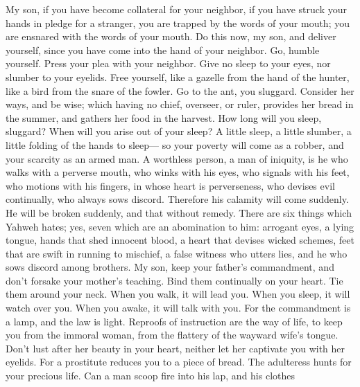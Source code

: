  My son, if you have become collateral for your neighbor,
if you have struck your hands in pledge for a stranger, 
you are trapped by the words of your mouth; you are ensnared with the
words of your mouth.  Do this now, my son, and deliver
yourself, since you have come into the hand of your neighbor. Go, humble
yourself. Press your plea with your neighbor.  Give no
sleep to your eyes, nor slumber to your eyelids.  Free
yourself, like a gazelle from the hand of the hunter, like a bird from
the snare of the fowler.  Go to the ant, you sluggard.
Consider her ways, and be wise;  which having no chief,
overseer, or ruler,  provides her bread in the summer, and
gathers her food in the harvest.  How long will you sleep,
sluggard? When will you arise out of your sleep?  A
little sleep, a little slumber, a little folding of the hands to
sleep---  so your poverty will come as a robber, and your
scarcity as an armed man.  A worthless person, a man of
iniquity, is he who walks with a perverse mouth,  who
winks with his eyes, who signals with his feet, who motions with his
fingers,  in whose heart is perverseness, who devises
evil continually, who always sows discord.  Therefore his
calamity will come suddenly. He will be broken suddenly, and that
without remedy.  There are six things which Yahweh hates;
yes, seven which are an abomination to him:  arrogant
eyes, a lying tongue, hands that shed innocent blood,  a
heart that devises wicked schemes, feet that are swift in running to
mischief,  a false witness who utters lies, and he who
sows discord among brothers.  My son, keep your father's
commandment, and don't forsake your mother's teaching. 
Bind them continually on your heart. Tie them around your neck.
 When you walk, it will lead you. When you sleep, it will
watch over you. When you awake, it will talk with you. 
For the commandment is a lamp, and the law is light. Reproofs of
instruction are the way of life,  to keep you from the
immoral woman, from the flattery of the wayward wife's tongue.
 Don't lust after her beauty in your heart, neither let
her captivate you with her eyelids.  For a prostitute
reduces you to a piece of bread. The adulteress hunts for your precious
life.  Can a man scoop fire into his lap, and his clothes
